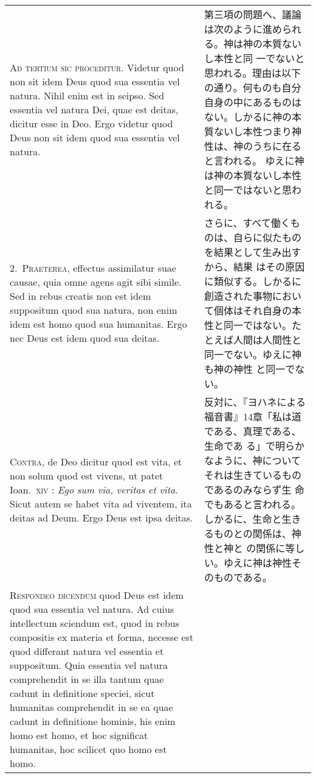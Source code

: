 \documentclass[10pt]{jsarticle}
\begin{document}
\begin{longtable}{p{21em}p{21em}}


\textsc{Ad tertium sic proceditur}. Videtur quod non sit idem Deus
quod sua essentia vel natura. Nihil enim est in seipso. Sed essentia
vel natura Dei, quae est deitas, dicitur esse in Deo. Ergo videtur
quod Deus non sit idem quod sua essentia vel natura.


&

第三項の問題へ、議論は次のように進められる。神は神の本質ないし本性と同
一でないと思われる。理由は以下の通り。何ものも自分自身の中にあるものは
ない。しかるに神の本質ないし本性つまり神性は、神のうちに在ると言われる。
ゆえに神は神の本質ないし本性と同一ではないと思われる。

\\

2.~\textsc{Praeterea}, effectus assimilatur suae causae, quia omne
agens agit sibi simile. Sed in rebus creatis non est idem suppositum
quod sua natura, non enim idem est homo quod sua humanitas. Ergo nec
Deus est idem quod sua deitas.

&

さらに、すべて働くものは、自らに似たものを結果として生み出すから、結果
はその原因に類似する。しかるに創造された事物において個体はそれ自身の本
性と同一ではない。たとえば人間は人間性と同一でない。ゆえに神も神の神性
と同一でない。

\\


\textsc{Contra}, de Deo dicitur quod est vita, et non solum quod est
vivens, ut patet Ioan.~\textsc{xiv} : \textit{Ego sum via, veritas et
vita}. Sicut autem se habet vita ad viventem, ita deitas ad Deum. Ergo
Deus est ipsa deitas.

&

反対に、『ヨハネによる福音書』14章「私は道である、真理である、生命であ
る」で明らかなように、神についてそれは生きているものであるのみならず生
命でもあると言われる。しかるに、生命と生きるものとの関係は、神性と神と
の関係に等しい。ゆえに神は神性そのものである。

\\



\textsc{Respondeo dicendum} quod Deus est idem quod sua essentia vel
natura.  Ad cuius intellectum sciendum est, quod in rebus compositis
ex materia et forma, necesse est quod differant natura vel essentia et
suppositum.  Quia essentia vel natura comprehendit in se illa tantum
quae cadunt in definitione speciei, sicut humanitas comprehendit in se
ea quae cadunt in definitione hominis, his enim homo est homo, et hoc
significat humanitas, hoc scilicet quo homo est homo.


\end{longtable}
\end{document}
